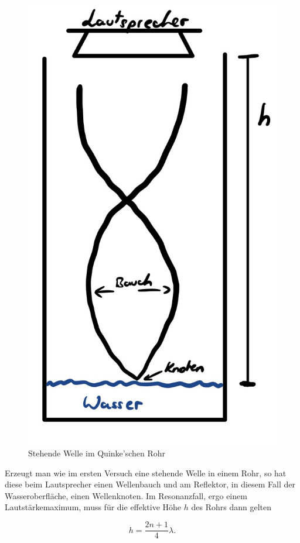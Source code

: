 \documentclass{article}
\begin{document}
\begin{figure}
\includegraphics[width=0.9\linewidth]{graphics/Skizze1-1.jpg} 
\caption{Stehende Welle im Quinke'schen Rohr}
\label{fig:wrapfig}
\end{figure}

Erzeugt man wie im ersten Versuch eine stehende Welle in einem Rohr, so hat diese beim Lautsprecher einen Wellenbauch und am Reflektor, in diesem Fall der Wasseroberfläche, einen Wellenknoten. Im Resonanzfall, ergo einem Lautstärkemaximum, muss für die effektive Höhe $h$ des Rohrs dann gelten

\begin{equation}
    h=\frac{2n+1}{4} \lambda . \label{fr:N1}
\end{equation}
\end{document}
